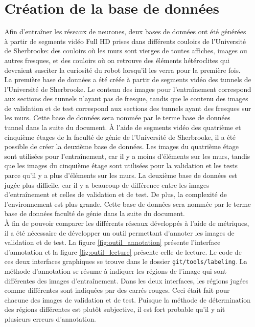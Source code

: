 \section{Création de la base de données}
    Afin d'entraîner les réseaux de neurones, deux bases de données ont été générées à partir de segments vidéo Full HD prises dans différents couloirs de l’Université de Sherbrooke: des couloirs où les murs sont vierges de toutes affiches, images ou autres fresques, et des couloirs où on retrouve des éléments hétéroclites qui devraient susciter la curiosité du robot lorsqu’il les verra pour la première fois.\\
    
    La première base de données a été créée à partir de segments vidéo des tunnels de l'Université de Sherbrooke. Le contenu des images pour l'entraînement correspond aux sections des tunnels n'ayant pas de fresque, tandis que le contenu des images de validation et de test correspond aux sections des tunnels ayant des fresques sur les murs. Cette base de données sera nommée par le terme base de données tunnel dans la suite du document. À l'aide de segments vidéo des quatrième et cinquième étages de la faculté de génie de l'Université de Sherbrooke, il a été possible de créer la deuxième base de données. Les images du quatrième étage sont utilisées pour l'entraînement, car il y a moins d'éléments sur les murs, tandis que les images du cinquième étage sont utilisées pour la validation et les tests parce qu'il y a plus d'éléments sur les murs. La deuxième base de données est jugée plus difficile, car il y a beaucoup de différence entre les images d'entraînement et celles de validation et de test. De plus, la complexité de l'environnement est plus grande. Cette base de données sera nommée par le terme base de données faculté de génie dans la suite du document.\\
    
    À fin de pouvoir comparer les différents réseaux développés à l'aide de métriques, il a été nécessaire de développer un outil permettant d'annoter les images de validation et de test. La figure \ref{fig:outil_annotation} présente l'interface d'annotation et la figure \ref{fig:outil_lecture} présente celle de lecture. Le code de ces deux interfaces graphiques se trouve dans le dossier \texttt{git/tools/labeling}. La méthode d'annotation se résume à indiquer les régions de l'image qui sont différentes des images d'entraînement. Dans les deux interfaces, les régions jugées comme différentes sont indiquées par des carrés rouges. Ceci était fait pour chacune des images de validation et de test. Puisque la méthode de détermination des régions différentes est plutôt subjective, il est fort probable qu'il y ait plusieurs erreurs d'annotation.
    
